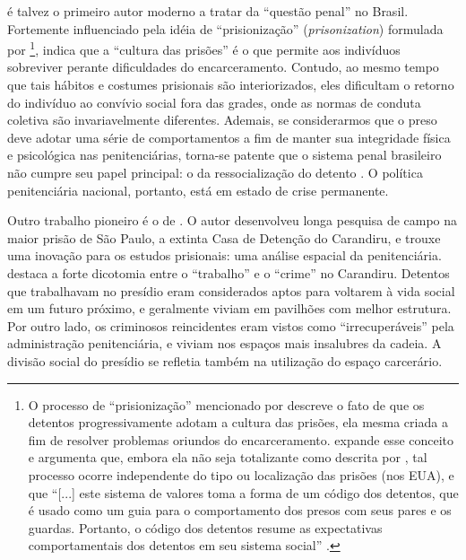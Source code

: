 \documentclass[a4paper,11pt]{article}
\begin{document}
\citet{thompson1980questao} é talvez o primeiro autor moderno a tratar da ``questão penal'' no Brasil. Fortemente influenciado pela idéia de ``prisionização'' (\textit{prisonization}) formulada por \citet{clemmer1940prison}\footnote{O processo de ``prisionização'' mencionado por \citeauthor{clemmer1940prison} descreve o fato de que os detentos progressivamente adotam a cultura das prisões, ela mesma criada a fim de resolver problemas oriundos do encarceramento. \cite{sykes1958society} expande esse conceito e argumenta que, embora ela não seja totalizante como descrita por \citeauthor{clemmer1940prison}, tal processo ocorre independente do tipo ou localização das prisões (nos EUA), e que ``[...] este sistema de valores toma a forma de um código dos detentos, que é usado como um guia para o comportamento dos presos com seus pares e os guardas. Portanto, o código dos detentos resume as expectativas comportamentais dos detentos em seu sistema social'' \citep[429]{paterline1999structural}.}, \citeauthor{thompson1980questao} indica que a ``cultura das prisões'' é o que permite aos indivíduos sobreviver perante dificuldades do encarceramento. Contudo, ao mesmo tempo que tais hábitos e costumes prisionais são interiorizados, eles dificultam o retorno do indivíduo ao convívio social fora das grades, onde as normas de conduta coletiva são invariavelmente diferentes. Ademais, se considerarmos que o preso deve adotar uma série de comportamentos a fim de manter sua integridade física e psicológica nas penitenciárias, torna-se patente que o sistema penal brasileiro não cumpre seu papel principal: o da ressocialização do detento \citep{silva2011visao}. O política penitenciária nacional, portanto, está em estado de crise permanente.

Outro trabalho pioneiro é o de \citet{ramalho1979mundo}. O autor desenvolveu longa pesquisa de campo na maior prisão de São Paulo, a extinta Casa de Detenção do Carandiru, e trouxe uma inovação para os estudos prisionais: uma análise espacial da penitenciária. \citeauthor{ramalho1979mundo} destaca a forte dicotomia entre o ``trabalho'' e o ``crime'' no Carandiru. Detentos que trabalhavam no presídio eram considerados aptos para voltarem à vida social em um futuro próximo, e geralmente viviam em pavilhões com melhor estrutura. Por outro lado, os criminosos reincidentes eram vistos como ``irrecuperáveis'' pela administração penitenciária, e viviam nos espaços mais insalubres da cadeia. A divisão social do presídio se refletia também na utilização do espaço carcerário.
\end{document}
